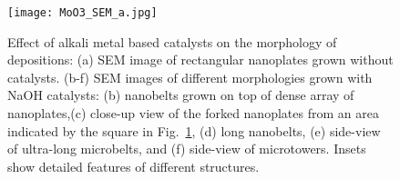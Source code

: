 \begin{figure}[htb]
\centering
\texttt{[image: MoO3\_SEM\_a.jpg]}
\caption[Effect of alkali metal based catalysts on the morphology of  depositions]{Effect of alkali metal based catalysts on the morphology of  depositions: (a) SEM image of rectangular nanoplates grown without catalysts. (b-f) SEM images of different morphologies grown with NaOH catalysts: (b) nanobelts grown on top of dense array of nanoplates,(c) close-up view of the forked nanoplates from an area indicated by the square in Fig.~\ref{fig:ch4sem2by3}, (d) long nanobelts, (e) side-view of ultra-long microbelts, and (f) side-view of microtowers. Insets show detailed features of different  structures.}
\label{fig:ch4sem2by3}
\end{figure}

